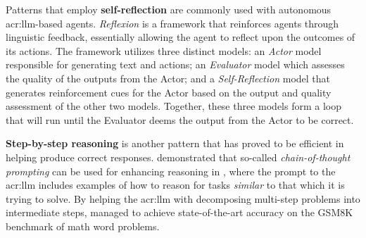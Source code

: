 Patterns that employ \textbf{self-reflection} are commonly used with autonomous \acrshort{acr:llm}-based agents. \textit{Reflexion} \citep{shinnReflexionLanguageAgents2023} is a framework that reinforces agents through linguistic feedback, essentially allowing the agent to reflect upon the outcomes of its actions. The framework utilizes three distinct models: an \textit{Actor} model responsible for generating text and actions; an \textit{Evaluator} model which assesses the quality of the outputs from the Actor; and a \textit{Self-Reflection} model that generates reinforcement cues for the Actor based on the output and quality assessment of the other two models. Together, these three models form a loop that will run until the Evaluator deems the output from the Actor to be correct.

\textbf{Step-by-step reasoning} is another pattern that has proved to be efficient in helping  produce correct responses. \cite{weiChainofThoughtPromptingElicits2023a} demonstrated that so-called \textit{chain-of-thought prompting} can be used for enhancing reasoning in , where the prompt to the \acrshort{acr:llm} includes examples of how to reason for tasks \textit{similar} to that which it is trying to solve. By helping the \acrshort{acr:llm} with decomposing multi-step problems into intermediate steps, \citeauthor{weiChainofThoughtPromptingElicits2023a} managed to achieve state-of-the-art accuracy on the GSM8K benchmark of math word problems.


\glsresetall
